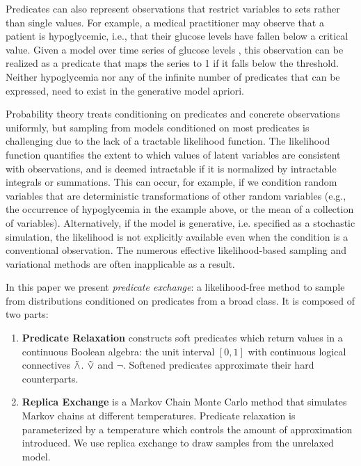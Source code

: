 Predicates can also represent observations that restrict variables to sets rather than single values.
For example, a medical practitioner may observe that a patient is hypoglycemic, i.e., that their glucose levels have fallen below a critical value.
Given a model over time series of glucose levels \citep{levine2017offline,murata2004probabilistic}, this observation can be realized as a predicate that maps the series to 1 if it falls below the threshold.
Neither hypoglycemia nor any of the infinite number of predicates that can be expressed, need to exist in the generative model apriori.

Probability theory treats conditioning on predicates and concrete observations uniformly, but sampling from models conditioned on most predicates is challenging due to the lack of a tractable likelihood function.
The likelihood function quantifies the extent to which values of latent variables are consistent with observations, and is deemed intractable if it is normalized by intractable integrals or summations.
This can occur, for example, if we condition random variables that are deterministic transformations of other random variables (e.g., the occurrence of hypoglycemia in the example above, or the mean of a collection of variables).	
Alternatively, if the model is generative, i.e. specified as a stochastic simulation, the likelihood is not explicitly available even when the condition is a conventional observation.
The numerous effective likelihood-based sampling \citep{andrieu2003introduction} and variational  \citep{jordan1999introduction, ranganath2014black} methods are often inapplicable as a result.


In this paper we present \emph{predicate exchange}:
a likelihood-free method to sample from distributions conditioned on predicates from a broad class.
It is composed of two parts:
\begin{enumerate}
\item \textbf{Predicate Relaxation} constructs soft predicates which return values in a continuous Boolean algebra: the unit interval $[0, 1]$ with continuous logical connectives $\mathrel{\tilde{\land}}$. $\mathrel{\tilde{\lor}}$ and $\neg$.  Softened predicates approximate their hard counterparts.
\item  \textbf{Replica Exchange} is a Markov Chain Monte Carlo method that simulates Markov chains at different temperatures.  Predicate relaxation is parameterized by a temperature which controls the amount of approximation introduced.  We use replica exchange to draw samples from the unrelaxed model. 
\end{enumerate}

